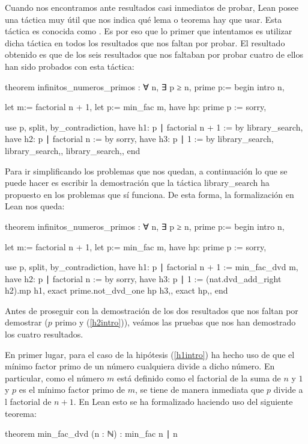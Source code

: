 Cuando nos encontramos ante resultados casi inmediatos de probar, Lean posee
una táctica muy útil que nos indica qué lema o teorema hay que usar. Esta
táctica es conocida como . Es por eso
que lo primer que intentamos es utilizar dicha táctica en todos los resultados
que nos faltan por probar. El resultado obtenido es que de los seis resultados
que nos faltaban por probar cuatro de ellos han sido probados con esta
táctica:
\begin{leancode}
theorem infinitos_numeros_primos : ∀ n, ∃ p ≥ n, prime p:=
begin
  intro n,

  let m:= factorial n + 1,
  let p:= min_fac m,
  have hp: prime p := sorry,

  use p,
  split,
  { by_contradiction,
    have h1: p ∣ factorial n + 1 := by library_search,
    have h2: p ∣ factorial n := by sorry,
    have h3: p ∣ 1 := by library_search,  
    library_search,},
  {library_search,},
end
\end{leancode}

Para ir simplificando los problemas que nos quedan, a continuación lo que se
puede hacer es escribir la demostración que la táctica 
{library\_search} ha propuesto en los problemas que sí funciona. De esta forma,
la formalización en Lean nos queda:
\begin{leancode}
theorem infinitos_numeros_primos : ∀ n, ∃ p ≥ n, prime p:=
begin
  intro n,

  let m:= factorial n + 1,
  let p:= min_fac m,
  have hp: prime p := sorry,

  use p,
  split,
  { by_contradiction,
    have h1: p ∣ factorial n + 1 := min_fac_dvd m,
    have h2: p ∣ factorial n := by sorry,
    have h3: p ∣ 1 := (nat.dvd_add_right h2).mp h1,  
    exact prime.not_dvd_one hp h3,},
  {exact hp,},
end
\end{leancode}

Antes de proseguir con la demostración de los dos resultados que nos faltan
por demostrar (\(p\) primo y (\ref{h2intro})), veámos las pruebas que nos han
demostrado los cuatro resultados.

En primer lugar, para el caso de la hipótesis (\ref{h1intro}) ha hecho uso
de que el mínimo factor primo de un número cualquiera divide a dicho número.
En particular, como el número \(m\) está definido como el factorial de la suma
de \(n\) y \(1\) y \(p\) es el mínimo factor primo de \(m\), se tiene de manera
inmediata que \(p\) divide a l factorial de \(n+1\). En Lean esto se ha
formalizado haciendo uso del siguiente teorema:
\begin{leancode}
theorem min_fac_dvd (n : ℕ) : min_fac n ∣ n
\end{leancode}

